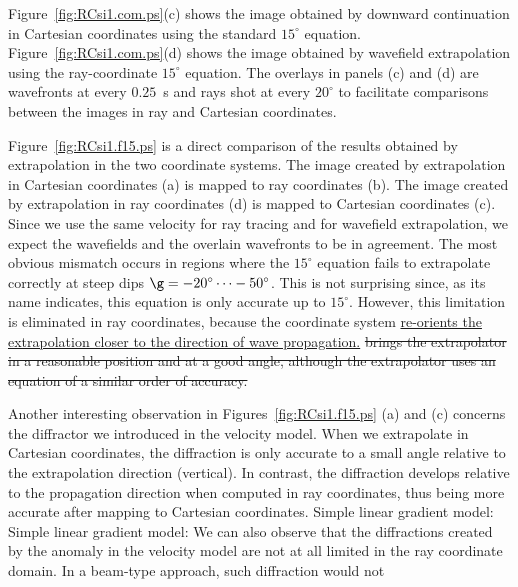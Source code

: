 \par
Figure~\ref{fig:RCsi1.com.ps}(c)
shows the image obtained by downward continuation 
in Cartesian coordinates
using the standard $15^\circ$ equation.
Figure~\ref{fig:RCsi1.com.ps}(d)
shows the image obtained by wavefield extrapolation
using the ray-coordinate $15^\circ$ equation.
The overlays in panels (c) and (d) are
wavefronts at every $0.25$~s and rays shot at
every $20^\circ$ to facilitate
comparisons between the images in ray and Cartesian
coordinates.
\par
Figure~\ref{fig:RCsi1.f15.ps} is a direct comparison
of the results obtained by extrapolation in the two
coordinate systems.
The image created by extrapolation in Cartesian 
coordinates (a) is mapped to ray coordinates (b).
The image created by extrapolation in ray coordinates (d)
is mapped to Cartesian coordinates (c).
Since we use the same velocity for ray tracing and
for wavefield extrapolation, we expect the
wavefields and the overlain wavefronts to be in 
agreement. The most obvious mismatch occurs in regions
where the $15^\circ$ equation fails to extrapolate
correctly at steep dips $\g=-20^\circ\dots-50^\circ$.
This is not surprising since, as its name indicates, 
this equation is only accurate up to $15^\circ$.
However, this limitation is eliminated in
ray coordinates, because the coordinate system
\uline{
re-orients the extrapolation closer to the 
direction of wave propagation.}
\sout{
brings the extrapolator in a reasonable position 
and at a good angle,
although the extrapolator uses an equation of a 
similar order of accuracy.}
\par
Another interesting observation in 
Figures~\ref{fig:RCsi1.f15.ps} (a) and (c)
concerns the diffractor we introduced in the velocity
model. When we extrapolate in Cartesian coordinates,
the diffraction is only accurate to a small angle
relative to the extrapolation direction (vertical).
In contrast, the diffraction develops relative to the 
propagation direction when computed in ray coordinates,
thus being more accurate after mapping to Cartesian 
coordinates.
{Simple linear gradient model: }
{Simple linear gradient model: }
We can also observe that the diffractions created
by the anomaly in the velocity model are not at all
limited in the ray coordinate domain.
In a beam-type approach, such diffraction would not 
